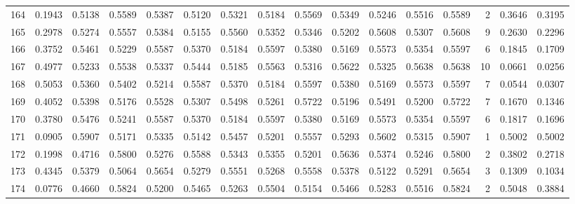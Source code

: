 \begin{tabular}{lrrrrrrrrrrrrrrr}
164 &      0.1943 &  0.5138 &  0.5589 &  0.5387 &  0.5120 &  0.5321 &  0.5184 &  0.5569 &  0.5349 &  0.5246 &   0.5516 &     0.5589 &      2 &                    0.3646 &                     0.3195 \\
165 &      0.2978 &  0.5274 &  0.5557 &  0.5384 &  0.5155 &  0.5560 &  0.5352 &  0.5346 &  0.5202 &  0.5608 &   0.5307 &     0.5608 &      9 &                    0.2630 &                     0.2296 \\
166 &      0.3752 &  0.5461 &  0.5229 &  0.5587 &  0.5370 &  0.5184 &  0.5597 &  0.5380 &  0.5169 &  0.5573 &   0.5354 &     0.5597 &      6 &                    0.1845 &                     0.1709 \\
167 &      0.4977 &  0.5233 &  0.5538 &  0.5337 &  0.5444 &  0.5185 &  0.5563 &  0.5316 &  0.5622 &  0.5325 &   0.5638 &     0.5638 &     10 &                    0.0661 &                     0.0256 \\
168 &      0.5053 &  0.5360 &  0.5402 &  0.5214 &  0.5587 &  0.5370 &  0.5184 &  0.5597 &  0.5380 &  0.5169 &   0.5573 &     0.5597 &      7 &                    0.0544 &                     0.0307 \\
169 &      0.4052 &  0.5398 &  0.5176 &  0.5528 &  0.5307 &  0.5498 &  0.5261 &  0.5722 &  0.5196 &  0.5491 &   0.5200 &     0.5722 &      7 &                    0.1670 &                     0.1346 \\
170 &      0.3780 &  0.5476 &  0.5241 &  0.5587 &  0.5370 &  0.5184 &  0.5597 &  0.5380 &  0.5169 &  0.5573 &   0.5354 &     0.5597 &      6 &                    0.1817 &                     0.1696 \\
171 &      0.0905 &  0.5907 &  0.5171 &  0.5335 &  0.5142 &  0.5457 &  0.5201 &  0.5557 &  0.5293 &  0.5602 &   0.5315 &     0.5907 &      1 &                    0.5002 &                     0.5002 \\
172 &      0.1998 &  0.4716 &  0.5800 &  0.5276 &  0.5588 &  0.5343 &  0.5355 &  0.5201 &  0.5636 &  0.5374 &   0.5246 &     0.5800 &      2 &                    0.3802 &                     0.2718 \\
173 &      0.4345 &  0.5379 &  0.5064 &  0.5654 &  0.5279 &  0.5551 &  0.5268 &  0.5558 &  0.5378 &  0.5122 &   0.5291 &     0.5654 &      3 &                    0.1309 &                     0.1034 \\
174 &      0.0776 &  0.4660 &  0.5824 &  0.5200 &  0.5465 &  0.5263 &  0.5504 &  0.5154 &  0.5466 &  0.5283 &   0.5516 &     0.5824 &      2 &                    0.5048 &                     0.3884 \\

\end{tabular}
